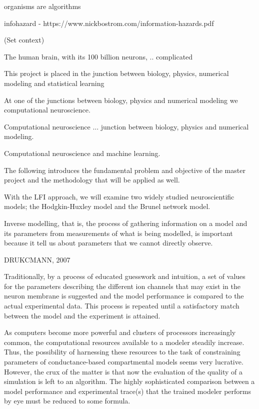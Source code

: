 organisms are algorithms

infohazard - https://www.nickbostrom.com/information-hazards.pdf

(Set context)

The human brain, with its 100 billion neurons, .. complicated 

This project is placed in the junction between biology, physics, numerical modeling and statistical learning 


At one of the junctions between biology, physics and numerical modeling we computational neuroscience. 

Computational neuroscience ... junction between biology, physics and numerical modeling. 

Computational neuroscience and machine learning. 

The following introduces the fundamental problem and objective of the master project and the methodology that will be applied as well.


With the LFI approach, we will examine two widely studied neuroscientific models; the Hodgkin-Huxley model and the Brunel network model. 


Inverse modelling, that is, the process of gathering information on a model and its parameters from measurements of what is being modelled, is important because it tell us about parameters that we cannot directly observe.  


DRUKCMANN, 2007 

Traditionally, by a process of educated guesswork and intuition, a set of values for the parameters describing the different ion channels that may exist in the neuron membrane is suggested and the model performance is compared to the actual experimental data. This process is repeated until a satisfactory match between the model and the experiment is attained.

As computers become more powerful and clusters of processors increasingly common, the computational resources available to a modeler steadily increase. Thus, the possibility of harnessing these resources to the task of constraining parameters of conductance-based compartmental models seems very lucrative. However, the crux of the matter is that now the evaluation of the quality of a simulation is left to an algorithm. The highly sophisticated comparison between a model performance and experimental trace(s) that the trained modeler performs by eye must be reduced to some formula.



